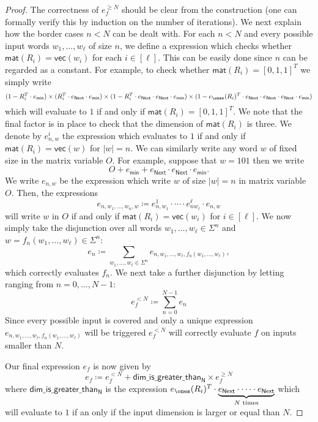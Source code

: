 \begin{proof}
The correctness of $e_f^{\geq N}$ should be clear from the construction (one can formally verify this by
induction on the number of iterations). We next explain how the border cases $n<N$ can be dealt with.
For each $n<N$ and every possible input words
$w_1,\ldots,w_\ell$ of size $n$, we define a \langfor expression which checks whether
$\mathsf{mat}(R_i)=\mathsf{vec}(w_i)$ for each $i\in[\ell]$. This can be easily done since $n$ 
can be regarded as a constant. For example, to check whether $\mathsf{mat}(R_i)=[0,1,1]^T$ we simply write
$$
(1- R_i^T\cdot e_{\mathsf{min}})\times (R_i^T\cdot e_{\mathsf{Next}}\cdot e_{\mathsf{min}})\times (1- R_i^T\cdot e_{\mathsf{Next}}\cdot e_{\mathsf{Next}}\cdot e_{\mathsf{min}})\times (1- e_{\ones}(R_i)^T\cdot e_{\mathsf{Next}}\cdot e_{\mathsf{Next}}\cdot e_{\mathsf{Next}}\cdot e_{\mathsf{min}})
$$
which will evaluate to $1$ if and only if $\mathsf{mat}(R_i)=[0,1,1]^T$. We note that the final factor is in 
place to check that the dimension of $\mathsf{mat}(R_i)$ is three.
  We denote by
$e_{n,w}^i$ the expression which evaluates to $1$ if and only if $\mathsf{mat}(R_i)=\mathsf{vec}(w)$
for $|w|=n$.
We can similarly
write any word $w$ of fixed size in the matrix variable $O$. For example, suppose that $w=101$
then we write 
$$
O+ e_{\mathsf{min}}+  e_{\mathsf{Next}}\cdot e_{\mathsf{Next}}\cdot e_{\mathsf{min}}.
$$
We write $e_{n,w}$ be the expression which write $w$ of size $|w|=n$ in matrix variable $O$.
Then, the expressions
$$
e_{n,w_1,\ldots,w_n,w}\coloneqq e_{n,w_1}^1\cdot\cdots\cdot e_{nw_{\ell}}^\ell\cdot e_{n,w}
$$
will write $w$ in $O$ if and only if $\mathsf{mat}(R_i)=\mathsf{vec}(w_i)$ for $i\in[\ell]$.
We now simply take the disjunction over all words 
$w_1,\ldots,w_\ell\in\Sigma^n$ and $w=f_n(w_1,\ldots,w_\ell)\in\Sigma^n$:
$$
e_n\coloneqq \sum_{w_1,\ldots,w_\ell\in\Sigma^n} e_{n,w_1,\ldots,w_\ell,f_n(w_1,\ldots,w_\ell)},
$$
which correctly evaluates $f_n$. We next take a further disjunction by letting ranging from 
$n=0,\ldots, N-1$:
$$
e_f^{<N}\coloneqq \sum_{n=0}^{N-1} e_n
$$
Since every possible input is covered and only a unique expression 
$ e_{n,w_1,\ldots,w_\ell,f_n(w_1,\ldots,w_\ell)}$ will be triggered $e_f^{<N}$ will correctly
evaluate $f$ on inputs smaller than $N$.

Our final expression $e_f$ is now given by
$$
e_f\coloneqq e_f^{<N} + \mathsf{dim\_is\_greater\_than_N}\times e_f^{\geq N}
$$
where $\mathsf{dim\_is\_greater\_than_N}$ is the expression
$e_{\ones}(R_i)^T\cdot\underbrace{e_{\mathsf{Next}}\cdot\cdots\cdot e_{\mathsf{Next}}}_{\text{$N$ times}}$ 
which will evaluate to $1$ if an only if the input dimension is larger or equal than $N$.
\end{proof}
